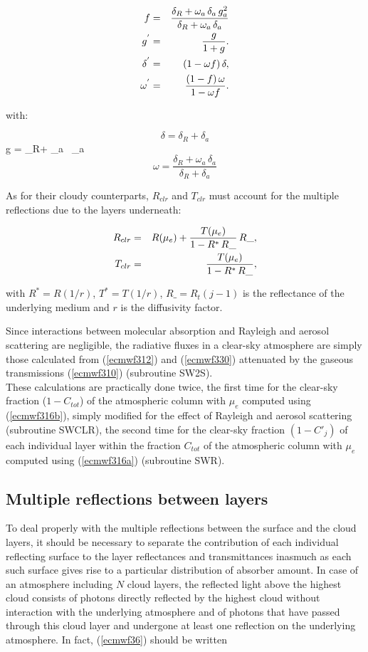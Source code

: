 \begin{eqnarray}
f  &=&  \frac{ \delta_R + \omega_a \, \delta_a \, g_a^2}
{\delta_R + \omega_a \, \delta_a} \cr
g^{'} &=& \frac{g}{1+g}. \cr
\delta^{'} &=& (1 - \omega f) \, \delta, \cr
\omega^{'}  &=& \frac{(1 - f) \, \omega}{1 - \omega f}.
\end{eqnarray}

with:

\medskip
\[
\delta = \delta_R + \delta_a 
\]
\be
g = 
{\delta_R+ \omega_a  \, \delta_a}
\label{ecmwf329}
\ee
\[
\omega = \frac{ \delta_R+ \omega_a \, \delta_a}{\delta_R + \delta_a }
\]

\medskip

As for their cloudy counterparts, $R_{clr}$ and $T_{clr}$  must account for the multiple reflections due to the layers underneath:

\medskip
\begin{eqnarray}\label{ecmwf330}
R_{clr} &=& R(\mu_e) + \frac{T(\mu_e)}{1 - R^{*} \, R\_} \, R\_, \cr
T_{clr} &=& \frac{T(\mu_e)}{1 - R^{*} \, R\_},
\end{eqnarray}
\medskip

\noindent with $R^{*} = R ({1}/{r})$, $T^{*} = T ({1}/{r})$, $R\_ = R_t(j-1)$
is the reflectance of the underlying medium and $r$ is the diffusivity factor.

Since interactions between molecular absorption and Rayleigh and aerosol
scattering are negligible, the radiative fluxes in a clear-sky atmosphere are
simply those calculated from (\ref{ecmwf312}) and (\ref{ecmwf330}) attenuated
by the gaseous transmissions (\ref{ecmwf310}) (subroutine SW2S).\\

These calculations are practically done twice, the first time for the clear-sky
fraction ($1-C_{tot}$) of the atmospheric column with $\mu_e$ computed using
(\ref{ecmwf316b}),  simply
modified for the effect of Rayleigh and aerosol scattering (subroutine SWCLR),
the second time for the clear-sky fraction $(1-C'_j)$ of each individual layer
within the fraction $C_{tot}$ of the atmospheric column with $\mu_e$
computed using (\ref{ecmwf316a}) (subroutine SWR).

%
\subsection{Multiple reflections between layers}
%
To deal properly with the multiple reflections between the surface and the
cloud layers, it should be necessary to separate the contribution of each
individual reflecting surface to the layer reflectances and transmittances
inasmuch as each such surface gives rise to a particular distribution of
absorber amount. In case of an atmosphere including $N$ cloud layers, the
reflected light above the highest cloud consists of photons directly reflected
by the highest cloud without interaction with the underlying atmosphere and of
photons that have passed through this cloud layer and undergone at least one
reflection on the underlying atmosphere. In fact, (\ref{ecmwf36}) should be
written

